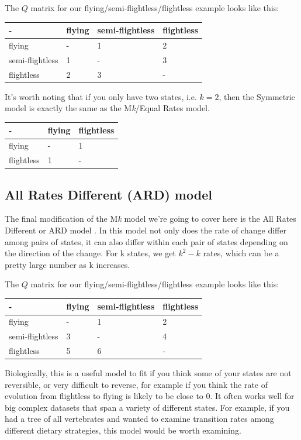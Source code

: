 \documentclass[]{book}
\begin{document}
The \(Q\) matrix for our flying/semi-flightless/flightless example looks
like this:

\begin{longtable}[]{@{}llll@{}}
\toprule
- & flying & semi-flightless & flightless\tabularnewline
\midrule
\endhead
flying & - & 1 & 2\tabularnewline
semi-flightless & 1 & - & 3\tabularnewline
flightless & 2 & 3 & -\tabularnewline
\bottomrule
\end{longtable}

It's worth noting that if you only have two states, i.e. \(k = 2\), then
the Symmetric model is exactly the same as the M\emph{k}/Equal Rates
model.

\begin{longtable}[]{@{}lll@{}}
\toprule
- & flying & flightless\tabularnewline
\midrule
\endhead
flying & - & 1\tabularnewline
flightless & 1 & -\tabularnewline
\bottomrule
\end{longtable}

\subsection{All Rates Different (ARD)
model}\label{all-rates-different-ard-model}

The final modification of the M\emph{k} model we're going to cover here
is the All Rates Different or ARD model \citep{paradis2004ape}. In this
model not only does the rate of change differ among pairs of states, it
can also differ within each pair of states depending on the direction of
the change. For k states, we get \(k^2 - k\) rates, which can be a
pretty large number as k increases.

The \(Q\) matrix for our flying/semi-flightless/flightless example looks
like this:

\begin{longtable}[]{@{}llll@{}}
\toprule
- & flying & semi-flightless & flightless\tabularnewline
\midrule
\endhead
flying & - & 1 & 2\tabularnewline
semi-flightless & 3 & - & 4\tabularnewline
flightless & 5 & 6 & -\tabularnewline
\bottomrule
\end{longtable}

Biologically, this is a useful model to fit if you think some of your
states are not reversible, or very difficult to reverse, for example if
you think the rate of evolution from flightless to flying is likely to
be close to 0. It often works well for big complex datasets that span a
variety of different states. For example, if you had a tree of all
vertebrates and wanted to examine transition rates among different
dietary strategies, this model would be worth examining.
\end{document}
